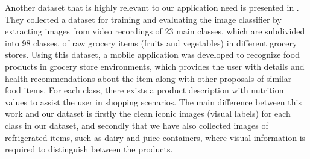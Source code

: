Another dataset that is highly relevant to our application need is presented in  . They collected a dataset for training and evaluating the image classifier by extracting images from video recordings of 23 main classes, which are subdivided into 98 classes, of raw grocery items (fruits and vegetables) in different grocery stores. Using this dataset, a mobile application was developed to recognize food products in grocery store environments, which provides the user with details and health recommendations about the item along with other proposals of similar food items. For each class, there exists a product description with nutrition values to assist the user in shopping scenarios. The main difference between this work and our dataset is firstly the clean iconic images (visual labels) for each class in our dataset, and secondly that we have also collected images of refrigerated items, such as dairy and juice containers, where visual information is required to distinguish between the products.  

